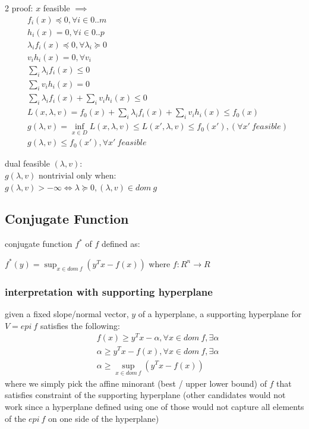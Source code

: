 \documentclass[8pt]{extarticle}
\begin{document}
\begin{multicols*}{2}
  proof:
  $x$ feasible $\implies$
  \begin{align*}
    &f_i(x) \preceq 0, \forall i \in 0..m\\
    &h_i(x) = 0, \forall i \in 0..p\\
    &\lambda_i f_i(x) \preceq 0, \forall \lambda_i \succeq 0\\
    &v_i h_i(x) = 0, \forall v_i\\
    &\sum_i \lambda_i f_i(x) \leq 0\\
    &\sum_i v_i h_i(x) = 0\\
    &\sum_i \lambda_i f_i(x) + \sum_i v_i h_i(x) \leq 0\\
    &L(x, \lambda, v) = f_0(x) + \sum_i \lambda_i f_i(x) + \sum_i v_i h_i(x) \leq f_0(x)\\
    &g(\lambda, v) = \inf_{x \in D} L(x, \lambda, v) \leq L(x', \lambda, v) \leq f_0(x'), (\forall x'\ feasible)\\
    &g(\lambda, v) \leq f_0(x'), \forall x'\ feasible
  \end{align*}

  dual feasible $(\lambda, v)$:\\
  $g(\lambda, v)$ nontrivial only when:\\
  $g(\lambda, v) > -\infty \iff \lambda \succeq 0, (\lambda, v) \in dom\ g$

  \vfill\null
  \columnbreak
    
  \subsection{Conjugate Function}

  conjugate function $f^*$ of $f$ defined as:

  $f^*(y) = \sup_{x \in dom\ f} (y^Tx - f(x))$ where $f: R^n \rightarrow R$

  \subsubsection{interpretation with supporting hyperplane}

  given a fixed slope/normal vector, $y$ of a hyperplane, a supporting hyperplane for $V = epi\ f$ satisfies the following:
  \begin{align*}
    &f(x) \geq y^T x - \alpha, \forall x \in dom\ f, \exists \alpha\\
    &\alpha \geq y^T x - f(x), \forall x \in dom\ f, \exists \alpha\\
    &\alpha \geq \sup_{x \in dom\ f} (y^T x - f(x))
  \end{align*}
  where we simply pick the affine minorant (best / upper lower bound) of $f$ that satisfies constraint of the supporting hyperplane (other candidates would not work since a hyperplane defined using one of those would not capture all elements of the $epi\ f$ on one side of the hyperplane)


\end{multicols*}
\end{document}
